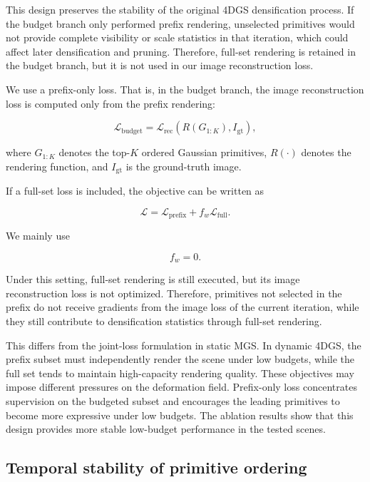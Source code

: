 \documentclass[pdflatex,sn-mathphys]{sn-jnl}
\begin{document}
This design preserves the stability of the original 4DGS densification process. If the budget branch only performed prefix rendering, unselected primitives would not provide complete visibility or scale statistics in that iteration, which could affect later densification and pruning. Therefore, full-set rendering is retained in the budget branch, but it is not used in our image reconstruction loss.

We use a prefix-only loss. That is, in the budget branch, the image reconstruction loss is computed only from the prefix rendering:

\begin{equation}
\mathcal{L}_{\mathrm{budget}}
=
\mathcal{L}_{\mathrm{rec}}(R(G_{1:K}), I_{\mathrm{gt}}),
\label{eq:budget_loss}
\end{equation}

where $G_{1:K}$ denotes the top-$K$ ordered Gaussian primitives, $R(\cdot)$ denotes the rendering function, and $I_{\mathrm{gt}}$ is the ground-truth image.

If a full-set loss is included, the objective can be written as

\begin{equation}
\mathcal{L}
=
\mathcal{L}_{\mathrm{prefix}}
+
f_w\mathcal{L}_{\mathrm{full}}.
\end{equation}

We mainly use

\begin{equation}
f_w = 0.
\end{equation}

Under this setting, full-set rendering is still executed, but its image reconstruction loss is not optimized. Therefore, primitives not selected in the prefix do not receive gradients from the image loss of the current iteration, while they still contribute to densification statistics through full-set rendering.

This differs from the joint-loss formulation in static MGS. In dynamic 4DGS, the prefix subset must independently render the scene under low budgets, while the full set tends to maintain high-capacity rendering quality. These objectives may impose different pressures on the deformation field. Prefix-only loss concentrates supervision on the budgeted subset and encourages the leading primitives to become more expressive under low budgets. The ablation results show that this design provides more stable low-budget performance in the tested scenes.

\subsection{Temporal stability of primitive ordering}
\label{sec:static}
\end{document}
